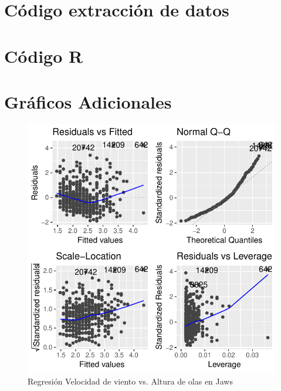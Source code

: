 \pagebreak
\appendix

\section{Código extracción de datos}%
\label{sec:codigo_extraccion_de_datos}



\pagebreak

\section{Código R}%
\label{sec:codigo_r}



\section{Gráficos Adicionales}
\label{sec:extra_plots}


\begin{figure}[H]
    \centering
    \includegraphics{./figures/jaws_500_lm.pdf}
    \caption{Regresión Velocidad de viento vs. Altura de olas en Jaws}
    \label{fig:wind_waves_jaws_fit_anal}
\end{figure}

